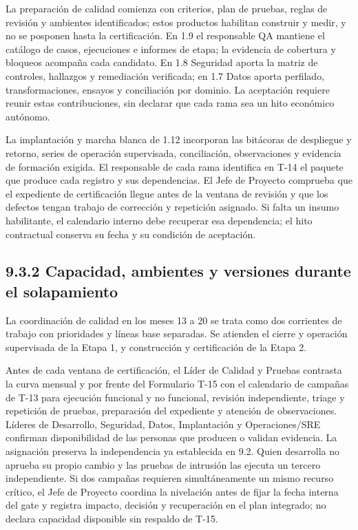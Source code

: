 \documentclass[11pt]{article}
\begin{document}
La preparación de calidad comienza con criterios, plan de pruebas, reglas de revisión y ambientes identificados; estos productos habilitan construir y medir, y no se posponen hasta la certificación. En 1.9 el responsable QA mantiene el catálogo de casos, ejecuciones e informes de etapa; la evidencia de cobertura y bloqueos acompaña cada candidato. En 1.8 Seguridad aporta la matriz de controles, hallazgos y remediación verificada; en 1.7 Datos aporta perfilado, transformaciones, ensayos y conciliación por dominio. La aceptación requiere reunir estas contribuciones, sin declarar que cada rama sea un hito económico autónomo.

La implantación y marcha blanca de 1.12 incorporan las bitácoras de despliegue y retorno, series de operación supervisada, conciliación, observaciones y evidencia de formación exigida. El responsable de cada rama identifica en T-14 el paquete que produce cada registro y sus dependencias. El Jefe de Proyecto comprueba que el expediente de certificación llegue antes de la ventana de revisión y que los defectos tengan trabajo de corrección y repetición asignado. Si falta un insumo habilitante, el calendario interno debe recuperar esa dependencia; el hito contractual conserva su fecha y su condición de aceptación.

\subsection{9.3.2 Capacidad, ambientes y versiones durante el solapamiento}

La coordinación de calidad en los meses 13 a 20 se trata como dos corrientes de trabajo con prioridades y líneas base separadas. Se atienden el cierre y operación supervisada de la Etapa 1, y construcción y certificación de la Etapa 2.

Antes de cada ventana de certificación, el Líder de Calidad y Pruebas contrasta la curva mensual y por frente del Formulario T-15 con el calendario de campañas de T-13 para ejecución funcional y no funcional, revisión independiente, triage y repetición de pruebas, preparación del expediente y atención de observaciones. Líderes de Desarrollo, Seguridad, Datos, Implantación y Operaciones/SRE confirman disponibilidad de las personas que producen o validan evidencia. La asignación preserva la independencia ya establecida en 9.2. Quien desarrolla no aprueba su propio cambio y las pruebas de intrusión las ejecuta un tercero independiente. Si dos campañas requieren simultáneamente un mismo recurso crítico, el Jefe de Proyecto coordina la nivelación antes de fijar la fecha interna del gate y registra impacto, decisión y recuperación en el plan integrado; no declara capacidad disponible sin respaldo de T-15.
\end{document}
